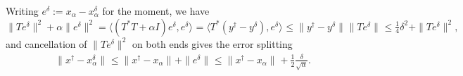 \documentclass[10pt, a4paper]{iopart}
\newcommand{\norm}[2]{     \| #1       \|_{ #2 }}
\newcommand{\scalar}[2]{     \langle #1       \rangle_{ #2 }}
\theoremstyle{remark}
\theoremstyle{definition}
\begin{document}
Writing $e^\delta := x_\alpha - x_\alpha^\delta$ for the moment,
we have
$ %
	\norm{ T e^\delta }{}^2 + \alpha \norm{ e^\delta }{}^2
=
	\scalar{ (T^* T + \alpha I) e^\delta, e^\delta }{}
=
	\scalar{ T^* (y^\dag - y^\delta), e^\delta }{}
\leq
	\norm{ y^\dag - y^\delta }{} \norm{ T e^\delta }{}
\leq
	\tfrac14 \delta^2 + \norm{ T e^\delta }{}^2
	,
$ %
and cancellation of $\norm{ T e^\delta }{}^2$ on both ends gives
the error splitting 
\begin{align}
\label{e:xad}
	\norm{ x^\dag - x_\alpha^\delta }{}
	\leq
	\norm{ x^\dag - x_\alpha }{}
	+
	\norm{ e^\delta }{}
	\leq
	\norm{ x^\dag - x_\alpha }{}
	+
	\tfrac12
	\tfrac{\delta}{\sqrt{\alpha}}
	.
\end{align}
%
\end{document}
